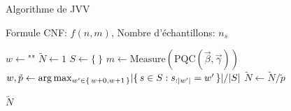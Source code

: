 
\begin{algorithm}[hb!]
    \caption{Algorithme de JVV}\label{alg:algorithme-jvv}
    \begin{algorithmic}[1]
    \REQUIRE Formule CNF: $f(n, m)$, Nombre d'échantillons: $n_{s}$

    \STATE $w \leftarrow \texttt{""}$ 
    \STATE $\tilde{N} \leftarrow 1$
    \STATE $S \leftarrow \{ \ \}$
    \STATE $m \leftarrow \text{Measure}(\text{PQC}(\vec{\beta}, \vec{\gamma}))$
    \ENDWHILE
    \STATE $w, \tilde{p} \leftarrow \arg \max_{w' \in \set{ w + 0, w + 1 }} \lvert \set{ s \in S : s_{:\lvert w' \rvert } = w' } \rvert / \lvert S \rvert$
    \STATE $\tilde{N} \leftarrow \tilde{N} / \tilde{p}$
    \ENDFOR
    
    \RETURN $\tilde{N}$
\end{algorithmic}
\end{algorithm}
